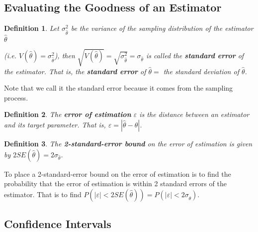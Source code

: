\documentclass[a4paper,12pt]{article}
\theoremstyle{nonitalic}
\newtheorem{definition}{Definition}[subsection]
\begin{document}
    \subsection{Evaluating the Goodness of an Estimator}

    \begin{definition}
        Let \(\sigma^2_{\hat{\theta}}\) be the variance of the sampling distribution of the estimator \(\hat{\theta}\)

        (i.e. \(V(\hat{\theta}) = \sigma^2_{\hat{\theta}}\)), then \(\sqrt{V(\hat{\theta})} = \sqrt{\sigma^2_{\hat{\theta}}} = \sigma_{\hat{\theta}}\) is called the \textbf{standard error} of the estimator. That is, the \textbf{standard error} of \(\hat{\theta} =\) the standard deviation of \(\hat{\theta}\).
    \end{definition}
    Note that we call it the standard error because it comes from the sampling process.

    \bigskip

    \begin{definition}
        The \textbf{error of estimation} \(\varepsilon\) is the distance between an estimator and its target parameter. That is, \(\varepsilon = |\hat{\theta} - \theta|\).
    \end{definition}

    \bigskip

    \begin{definition}
        The \textbf{2-standard-error bound} on the error of estimation is given by $2SE(\hat{\theta}) = 2\sigma_{\hat{\theta}}$.
    \end{definition}
    To place a 2-standard-error bound on the error of estimation is to find the probability that the error of estimation is within 2 standard errors of the estimator. That is to find $P(|\varepsilon| < 2SE(\hat{\theta})) = P(|\varepsilon| < 2 \sigma_{\hat{\theta}})$.

    \newpage

    \subsection{Confidence Intervals}

    
\end{document}
